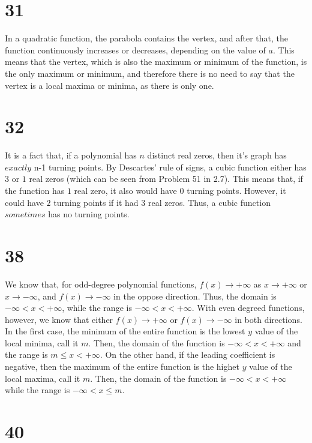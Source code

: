 \documentclass{article}
\theoremstyle{definition}
\begin{document}
\section*{31}


In a quadratic function, the parabola contains the vertex, and after that, the function continuously increases or decreases, depending on the value of $a$. This means that 
the vertex, which is also the maximum or minimum of the function, is the only maximum or minimum, and therefore there is no need to say that the vertex is a local 
maxima or minima, as there is only one.

\section*{32}


It is a fact that, if a polynomial has $n$ distinct real zeros, then it's graph has $exactly$ n-1 turning points. By Descartes' rule of signs, a cubic function either has 
$3$ or $1$ real zeros (which can be seen from Problem 51 in 2.7). This means that, if the function has $1$ real zero, it also would have 
$0$ turning points. However, it could have $2$ turning points if it had $3$ real zeros. Thus, a cubic function $sometimes$ has no turning points.

\section*{38}


We know that, for odd-degree polynomial functions, $f(x)\rightarrow +\infty$ as $x\rightarrow +\infty$ 
or $x\rightarrow -\infty$, and $f(x)\rightarrow -\infty$ in the oppose direction. Thus, the domain is 
$-\infty <x<+\infty$, while the range is $-\infty <x<+\infty$. With even degreed functions, however, 
we know that either $f(x)\rightarrow +\infty$ or $f(x)\rightarrow -\infty$ in both directions. In 
the first case, the minimum of the entire function is the lowest $y$ value of the local minima, 
call it $m$. Then, the domain of the function is $-\infty <x<+\infty$ and the range is $m\le x<+\infty$. 
On the other hand, if the leading coefficient is negative, then the maximum of the entire function is 
the highet $y$ value of the local maxima, call it $m$. Then, the domain of the function is 
$-\infty <x<+\infty$ while the range is $-\infty <x\le m$.

\section*{40}
\end{document}
